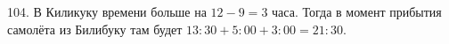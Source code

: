 104. В Киликуку времени больше на $12-9=3$ часа. Тогда в момент прибытия самолёта из Билибуку там будет $13:30+5:00+3:00=21:30.$\\
